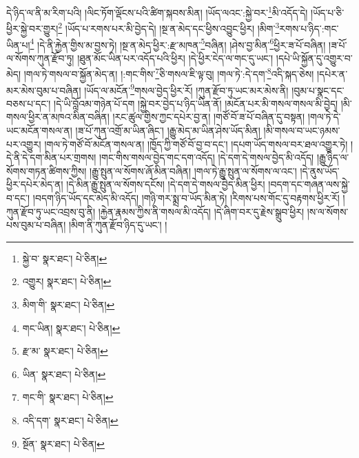 དེ་ཉིད་ལ་ནི་མ་རིག་པའི། །ལིང་ཏོག་ལྡོངས་པའི་ཚིག་སྐབས་མིན། །ཡོད་ལའང་:སྐྱེ་བར་\footnote{སྐྱེ་བ་  སྣར་ཐང་།  པེ་ཅིན། }མི་འདོད་དེ། །ཡོད་པ་ཅི་ཕྱིར་སྐྱེ་བར་གྱུར།\footnote{འགྱུར།  སྣར་ཐང་།  པེ་ཅིན། } །ཡོད་པ་རགས་པར་མི་བྱེད་དེ། །སྔ་ན་མེད་དང་ཕྱིས་འབྱུང་ཕྱིར། །མིག་\footnote{མིག་གི་  སྣར་ཐང་།  པེ་ཅིན། }རགས་པ་ཉིད་:གང་ཡིན་པ།\footnote{གང་ཡིན།  སྣར་ཐང་།  པེ་ཅིན། } །དེ་ནི་རྐྱེན་གྱིས་མ་བྱས་ཏེ། །སྔ་ན་མེད་ཕྱིར་:རྫ་མཁན་\footnote{རྫ་མ་  སྣར་ཐང་།  པེ་ཅིན། }བཞིན། །ཤེས་བྱ་མིན་\footnote{ཡིན་  སྣར་ཐང་།  པེ་ཅིན། }ཕྱིར་ཟ་པོ་བཞིན། །ཟ་པོ་ལ་སོགས་ཀུན་རྫོབ་ཏུ། །ཐུན་མོང་ཡིན་པར་འདོད་པའི་ཕྱིར། །དེ་ཕྱིར་ངེད་ལ་གང་དུ་ཡང་། །དཔེ་ཡི་སྐྱོན་དུ་འགྱུར་བ་མེད། །གལ་ཏེ་གསལ་བ་སྐྱོན་མེད་ན། །:གང་གིས་\footnote{གང་གི་  སྣར་ཐང་།  པེ་ཅིན། }ཅི་གསལ་ཇི་ལྟ་བུ། །གལ་ཏེ་:དེ་དག་\footnote{འདི་དག་  སྣར་ཐང་།  པེ་ཅིན། }འདི་སྐད་ཅེས། །དཔེར་ན་མར་མེས་བུམ་པ་བཞིན། །ཡོད་ལ་མངོན་\footnote{སྔོན་  སྣར་ཐང་།  པེ་ཅིན། }གསལ་བྱེད་ཕྱིར་རོ། །ཀུན་རྫོབ་ཏུ་ཡང་མར་མེས་ནི། །བུམ་པ་སྣང་དང་བཅས་པ་དང་། །དེ་ཡི་བློའམ་གཉེན་པོ་དག །སྐྱེ་བར་བྱེད་པ་ཉིད་ཡིན་ནོ། །མངོན་པར་མི་གསལ་གསལ་མི་བྱེད། །མི་གསལ་ཕྱིར་ན་མཁའ་མིན་བཞིན། །རང་ཚུལ་གྱིས་ཀྱང་དཔེར་བྱ་ན། །གཙོ་བོ་ཟ་པོ་བཞིན་དུ་བསྟན། །གལ་ཏེ་དེ་ཡང་མངོན་གསལ་ན། །ཟ་པོ་ཀུན་འགྲོ་མ་ཡིན་ཞིང་། །རྒྱུ་མེད་མ་ཡིན་ཤེས་ཡོད་མིན། །མི་གསལ་བ་ཡང་ཉམས་པར་འགྱུར། །གལ་ཏེ་གཙོ་བོ་མངོན་གསལ་ན། །ཁྱོད་ཀྱི་གཙོ་བོ་བྱ་བ་དང་། །དཔག་ཡོད་གསལ་བར་ཐལ་འགྱུར་ཏེ། །དེ་ནི་དེ་དག་མིན་པར་གྲགས། །གང་གིས་གསལ་བྱེད་གང་དག་འདོད། །དེ་དག་དེ་གསལ་བྱེད་མི་འདོད། །རྒྱུ་ཉིད་ལ་སོགས་གཏན་ཚིགས་ཀྱིས། །རྒྱུ་སྤུན་ལ་སོགས་ཞོ་མིན་བཞིན། །གལ་ཏེ་རྒྱུ་སྤུན་ལ་སོགས་ལ་འང་། །དེ་ནུས་ཡོད་ཕྱིར་དཔེར་མེད་ན། །དེ་མིན་རྒྱུ་སྤུན་ལ་སོགས་དངོས། །དེ་དག་དེ་གསལ་བྱེད་མིན་ཕྱིར། །བདག་དང་གཞན་ལས་སྐྱེ་བ་དང་། །བདག་ཉིད་ཡོད་དང་མེད་མི་འདོད། །གཉི་གར་སྨྲ་བ་ཡོད་མིན་ཏེ། །རིགས་པས་གོང་དུ་བརྟགས་ཕྱིར་རོ། །ཀུན་རྫོབ་ཏུ་ཡང་འབྲས་བུ་ནི། །རྐྱེན་རྣམས་ཀྱིས་ནི་གསལ་མི་འདོད། །དེ་ཞིག་བར་དུ་རྗེས་སྒྲུབ་ཕྱིར། །ས་ལ་སོགས་པས་བུམ་པ་བཞིན། །མིག་ནི་ཀུན་རྫོབ་ཉིད་དུ་ཡང་། །
